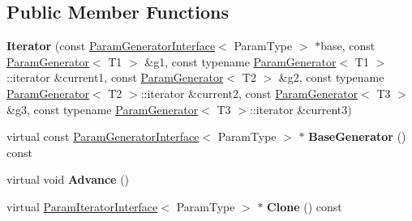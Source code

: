 \subsection*{Public Member Functions}
\begin{DoxyCompactItemize}
\item 
\mbox{\label{classtesting_1_1internal_1_1_cartesian_product_generator3_1_1_iterator_a3739498341c53ec3d82de143e64a1261}} 
{\bfseries Iterator} (const \mbox{\hyperlink{classtesting_1_1internal_1_1_param_generator_interface}{Param\+Generator\+Interface}}$<$ Param\+Type $>$ $\ast$base, const \mbox{\hyperlink{classtesting_1_1internal_1_1_param_generator}{Param\+Generator}}$<$ T1 $>$ \&g1, const typename \mbox{\hyperlink{classtesting_1_1internal_1_1_param_generator}{Param\+Generator}}$<$ T1 $>$\+::iterator \&current1, const \mbox{\hyperlink{classtesting_1_1internal_1_1_param_generator}{Param\+Generator}}$<$ T2 $>$ \&g2, const typename \mbox{\hyperlink{classtesting_1_1internal_1_1_param_generator}{Param\+Generator}}$<$ T2 $>$\+::iterator \&current2, const \mbox{\hyperlink{classtesting_1_1internal_1_1_param_generator}{Param\+Generator}}$<$ T3 $>$ \&g3, const typename \mbox{\hyperlink{classtesting_1_1internal_1_1_param_generator}{Param\+Generator}}$<$ T3 $>$\+::iterator \&current3)
\item 
\mbox{\label{classtesting_1_1internal_1_1_cartesian_product_generator3_1_1_iterator_ad76037cd5682bed7a008e12fa1f25e2f}} 
virtual const \mbox{\hyperlink{classtesting_1_1internal_1_1_param_generator_interface}{Param\+Generator\+Interface}}$<$ Param\+Type $>$ $\ast$ {\bfseries Base\+Generator} () const
\item 
\mbox{\label{classtesting_1_1internal_1_1_cartesian_product_generator3_1_1_iterator_a6ffc3e44fa0802839b28425aad9f6545}} 
virtual void {\bfseries Advance} ()
\item 
\mbox{\label{classtesting_1_1internal_1_1_cartesian_product_generator3_1_1_iterator_ac67b252fb09e5c1e2c1121fe6136aeea}} 
virtual \mbox{\hyperlink{classtesting_1_1internal_1_1_param_iterator_interface}{Param\+Iterator\+Interface}}$<$ Param\+Type $>$ $\ast$ {\bfseries Clone} () const

\end{DoxyCompactItemize}
